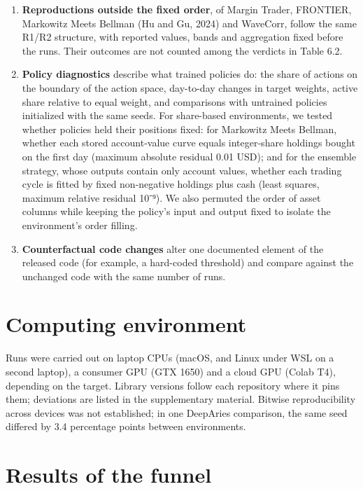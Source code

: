 \documentclass[12pt,a4paper]{report}
\providecommand{\tightlist}{\setlength{\itemsep}{0pt}\setlength{\parskip}{0pt}}
\begin{document}
\begin{enumerate}
\def\labelenumi{\arabic{enumi}.}
\tightlist
\item
  \textbf{Reproductions outside the fixed order}, of Margin Trader,
  FRONTIER, Markowitz Meets Bellman (Hu and Gu, 2024) and WaveCorr,
  follow the same R1/R2 structure, with reported values, bands and
  aggregation fixed before the runs. Their outcomes are not counted
  among the verdicts in Table 6.2.
\item
  \textbf{Policy diagnostics} describe what trained policies do: the
  share of actions on the boundary of the action space, day-to-day
  changes in target weights, active share relative to equal weight, and
  comparisons with untrained policies initialized with the same seeds.
  For share-based environments, we tested whether policies held their
  positions fixed: for Markowitz Meets Bellman, whether each stored
  account-value curve equals integer-share holdings bought on the first
  day (maximum absolute residual 0.01 USD); and for the ensemble
  strategy, whose outputs contain only account values, whether each
  trading cycle is fitted by fixed non-negative holdings plus cash
  (least squares, maximum relative residual 10⁻⁹). We also permuted the
  order of asset columns while keeping the policy's input and output
  fixed to isolate the environment's order filling.
\item
  \textbf{Counterfactual code changes} alter one documented element of
  the released code (for example, a hard-coded threshold) and compare
  against the unchanged code with the same number of runs.
\end{enumerate}

\section{Computing environment}\label{computing-environment}

Runs were carried out on laptop CPUs (macOS, and Linux under WSL on a
second laptop), a consumer GPU (GTX 1650) and a cloud GPU (Colab T4),
depending on the target. Library versions follow each repository where
it pins them; deviations are listed in the supplementary material.
Bitwise reproducibility across devices was not established; in one
DeepAries comparison, the same seed differed by 3.4 percentage points
between environments.

\section{Results of the funnel}\label{results-of-the-funnel}
\end{document}
